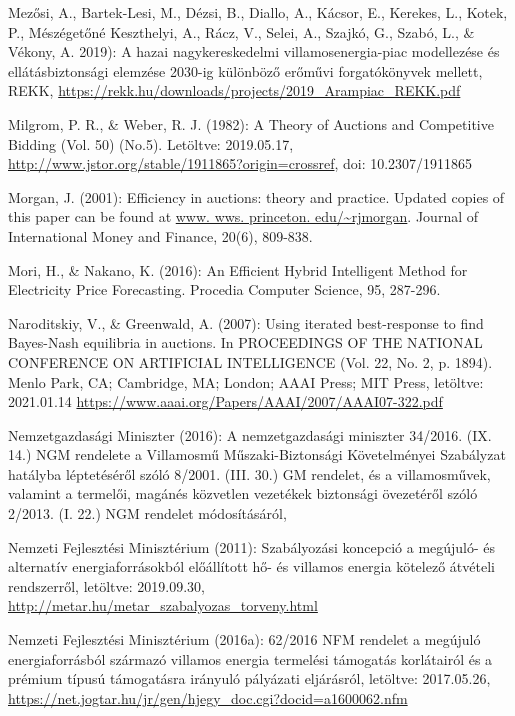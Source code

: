 \documentclass[twoside, magyar, showtrims]{corvinusphd}
\begin{document}
\begin{thebibliography}{99}
Mezősi, A., Bartek-Lesi, M., Dézsi, B., Diallo, A., Kácsor, E., Kerekes, L., Kotek, P., Mészégetőné Keszthelyi, A., Rácz, V., Selei, A., Szajkó, G., Szabó, L., \& Vékony, A. 2019): A hazai nagykereskedelmi villamosenergia-piac modellezése és ellátásbiztonsági elemzése 2030-ig különböző erőművi forgatókönyvek mellett, REKK, 
\url{https://rekk.hu/downloads/projects/2019\_Arampiac\_REKK.pdf}

Milgrom, P. R., \& Weber, R. J. (1982): A Theory of Auctions and Competitive Bidding (Vol. 50) (No.5). Letöltve: 2019.05.17, 
\url{http://www.jstor.org/stable/1911865?origin=crossref}, doi: 10.2307/1911865

Morgan, J. (2001): Efficiency in auctions: theory and practice.
Updated copies of this paper can be found at
\url{www. wws. princeton. edu/~rjmorgan}. Journal of International Money and Finance, 20(6), 809-838.

Mori, H., \& Nakano, K. (2016): An Efficient Hybrid Intelligent Method for Electricity Price Forecasting. Procedia Computer Science, 95, 287-296.

Naroditskiy, V., \& Greenwald, A. (2007): Using iterated best-response to find Bayes-Nash equilibria in auctions. In PROCEEDINGS OF THE NATIONAL CONFERENCE ON ARTIFICIAL INTELLIGENCE (Vol. 22, No. 2, p. 1894). Menlo Park, CA; Cambridge, MA; London; AAAI Press; MIT Press, letöltve: 2021.01.14
\url{https://www.aaai.org/Papers/AAAI/2007/AAAI07-322.pdf}

Nemzetgazdasági Miniszter (2016): A nemzetgazdasági miniszter 34/2016. (IX. 14.) NGM rendelete a Villamosmű Műszaki-Biztonsági Követelményei Szabályzat hatályba léptetéséről szóló 8/2001. (III. 30.) GM rendelet, és a villamosművek, valamint a termelői, magánés közvetlen vezetékek biztonsági övezetéről szóló 2/2013. (I. 22.) NGM rendelet módosításáról, 

Nemzeti Fejlesztési Minisztérium (2011): Szabályozási koncepció a megújuló- és alternatív energiaforrásokból előállított hő- és villamos energia kötelező átvételi rendszerről, letöltve: 2019.09.30,
\url{http://metar.hu/metar\_szabalyozas\_torveny.html}

Nemzeti Fejlesztési Minisztérium (2016a): 62/2016 NFM rendelet a megújuló energiaforrásból származó villamos energia termelési támogatás korlátairól és a prémium típusú támogatásra irányuló pályázati eljárásról, letöltve: 2017.05.26,
\url{https://net.jogtar.hu/jr/gen/hjegy\_doc.cgi?docid=a1600062.nfm}


\end{thebibliography}
\end{document}
